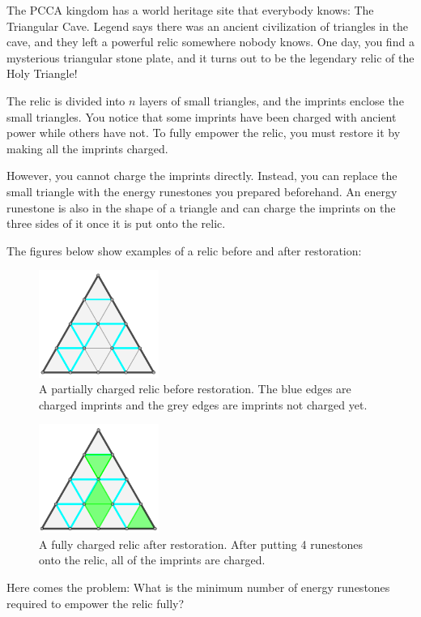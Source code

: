 The PCCA kingdom has a world heritage site that everybody knows: The Triangular Cave.
Legend says there was an ancient civilization of triangles in the cave, and they left a powerful relic somewhere nobody knows.
One day, you find a mysterious triangular stone plate, and it turns out to be the legendary relic of the Holy Triangle!

The relic is divided into $n$ layers of small triangles, and the imprints enclose the small triangles.
You notice that some imprints have been charged with ancient power while others have not.
To fully empower the relic, you must restore it by making all the imprints charged.

However, you cannot charge the imprints directly.
Instead, you can replace the small triangle with the energy runestones you prepared beforehand.
An energy runestone is also in the shape of a triangle and can charge the imprints on the three sides of it once it is put onto the relic.

The figures below show examples of a relic before and after restoration:

\begin{figure}[h]
\center
\includegraphics[width=0.35\textwidth]{image/relic1.png}
\caption{A partially charged relic before restoration. The blue edges are charged imprints and the grey edges are imprints not charged yet.}
\end{figure}
\begin{figure}[h]
\center
\includegraphics[width=0.35\textwidth]{image/relic2.png}
\caption{A fully charged relic after restoration. After putting 4 runestones onto the relic, all of the imprints are charged.}
\end{figure}

\newpage

Here comes the problem: What is the minimum number of energy runestones required to empower the relic fully?